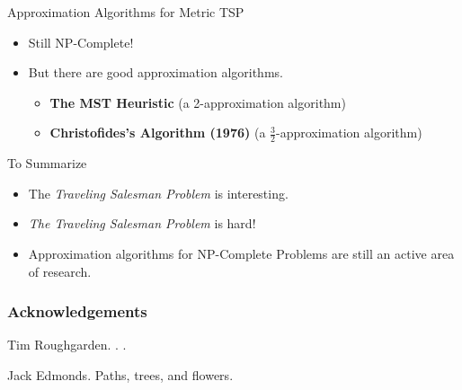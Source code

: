 \documentclass{beamer}
\begin{document}


\begin{frame}{Approximation Algorithms for Metric TSP}

       \begin{itemize}
    \item Still NP-Complete!
 \item But there are good approximation algorithms.
 \begin{itemize}
     \item \textbf{The MST Heuristic} (a 2-approximation algorithm)
     \item \textbf{Christofides's Algorithm (1976)} (a $\frac{3}{2}$-approximation algorithm)
 \end{itemize}
 \end{itemize}
\end{frame}


\begin{frame}{To Summarize}
  \begin{itemize}
  \item
    The \textit{Traveling Salesman Problem} is interesting.
  \item
    \textit{The Traveling Salesman Problem} is \alert{hard}! 
  \item
    Approximation algorithms for NP-Complete Problems are still an active area of research.
  \end{itemize}
\end{frame}



\appendix


\begin{frame}[allowframebreaks]
  \frametitle<presentation>{Acknowledgements}
    
  \begin{thebibliography}{10}
    
  \beamertemplatebookbibitems

    Tim Roughgarden.
    .
    .
 
    
  \beamertemplatearticlebibitems

    Jack Edmonds.
    \newblock Paths, trees, and flowers.
  \end{thebibliography}
\end{frame}
\end{document}
